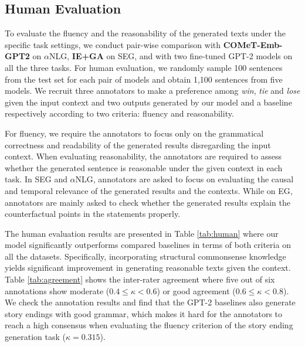 \documentclass[11pt,a4paper]{article}
\begin{document}
\subsection{Human Evaluation}

To evaluate the fluency and the reasonability of the generated texts under the specific task settings, we conduct pair-wise comparison with \textbf{COMeT-Emb-GPT2} on $\alpha$NLG, \textbf{IE+GA} on SEG, and with two fine-tuned GPT-2 models on all the three tasks. For human evaluation, we randomly sample 100 sentences from the test set for each pair of models and obtain 1,100 sentences from five models. %
We recruit three annotators to make a preference among \textit{win}, \textit{tie} and \textit{lose} given the input context and two outputs generated by our model and a baseline respectively according to two criteria: fluency and reasonability.

For fluency, we require the annotators to focus only on the grammatical correctness and readability of the generated results disregarding the input context. When evaluating reasonability, the annotators are required to assess whether the generated sentence is reasonable under the given context in each task. In SEG and $\alpha$NLG, annotators are asked to focus on evaluating the causal and temporal relevance of the generated results and the contexts. While on EG, annotators are mainly asked to check whether the generated results explain the counterfactual points in the statements properly.


The human evaluation results are presented in Table \ref{tab:human} where our model significantly outperforms compared baselines in terms of both criteria on all the datasets. Specifically, %
incorporating structural commonsense knowledge yields significant improvement in generating reasonable texts given the context. Table \ref{tab:agreement} shows the inter-rater agreement where five out of six annotations show moderate ($0.4\le \kappa <0.6$) or good agreement ($0.6\le \kappa <0.8$). We check the annotation results and find that the GPT-2 baselines also generate story endings with good grammar, which makes it hard for the annotators to reach a high consensus when evaluating the fluency criterion of the story ending generation task ($\kappa = 0.315$).
\end{document}
